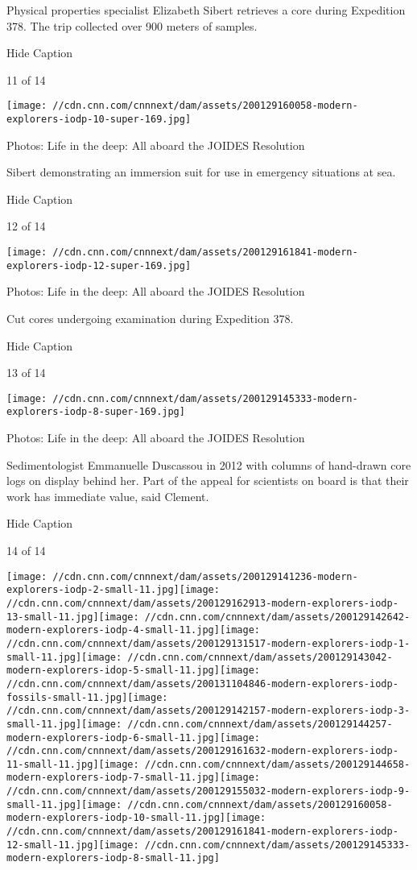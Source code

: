 Physical properties specialist Elizabeth Sibert retrieves a core during
Expedition 378. The trip collected over 900 meters of samples.

Hide Caption

11 of 14

\texttt{[image: //cdn.cnn.com/cnnnext/dam/assets/200129160058-modern-explorers-iodp-10-super-169.jpg]}

Photos: Life in the deep: All aboard the JOIDES Resolution

Sibert demonstrating an immersion suit for use in emergency situations
at sea.

Hide Caption

12 of 14

\texttt{[image: //cdn.cnn.com/cnnnext/dam/assets/200129161841-modern-explorers-iodp-12-super-169.jpg]}

Photos: Life in the deep: All aboard the JOIDES Resolution

Cut cores undergoing examination during Expedition 378.

Hide Caption

13 of 14

\texttt{[image: //cdn.cnn.com/cnnnext/dam/assets/200129145333-modern-explorers-iodp-8-super-169.jpg]}

Photos: Life in the deep: All aboard the JOIDES Resolution

Sedimentologist Emmanuelle Duscassou in 2012 with columns of hand-drawn
core logs on display behind her. Part of the appeal for scientists on
board is that their work has immediate value, said Clement.

Hide Caption

14 of 14

\texttt{[image: //cdn.cnn.com/cnnnext/dam/assets/200129141236-modern-explorers-iodp-2-small-11.jpg]}\texttt{[image: //cdn.cnn.com/cnnnext/dam/assets/200129162913-modern-explorers-iodp-13-small-11.jpg]}\texttt{[image: //cdn.cnn.com/cnnnext/dam/assets/200129142642-modern-explorers-iodp-4-small-11.jpg]}\texttt{[image: //cdn.cnn.com/cnnnext/dam/assets/200129131517-modern-explorers-iodp-1-small-11.jpg]}\texttt{[image: //cdn.cnn.com/cnnnext/dam/assets/200129143042-modern-explorers-idop-5-small-11.jpg]}\texttt{[image: //cdn.cnn.com/cnnnext/dam/assets/200131104846-modern-explorers-iodp-fossils-small-11.jpg]}\texttt{[image: //cdn.cnn.com/cnnnext/dam/assets/200129142157-modern-explorers-iodp-3-small-11.jpg]}\texttt{[image: //cdn.cnn.com/cnnnext/dam/assets/200129144257-modern-explorers-iodp-6-small-11.jpg]}\texttt{[image: //cdn.cnn.com/cnnnext/dam/assets/200129161632-modern-explorers-iodp-11-small-11.jpg]}\texttt{[image: //cdn.cnn.com/cnnnext/dam/assets/200129144658-modern-explorers-iodp-7-small-11.jpg]}\texttt{[image: //cdn.cnn.com/cnnnext/dam/assets/200129155032-modern-explorers-iodp-9-small-11.jpg]}\texttt{[image: //cdn.cnn.com/cnnnext/dam/assets/200129160058-modern-explorers-iodp-10-small-11.jpg]}\texttt{[image: //cdn.cnn.com/cnnnext/dam/assets/200129161841-modern-explorers-iodp-12-small-11.jpg]}\texttt{[image: //cdn.cnn.com/cnnnext/dam/assets/200129145333-modern-explorers-iodp-8-small-11.jpg]}

